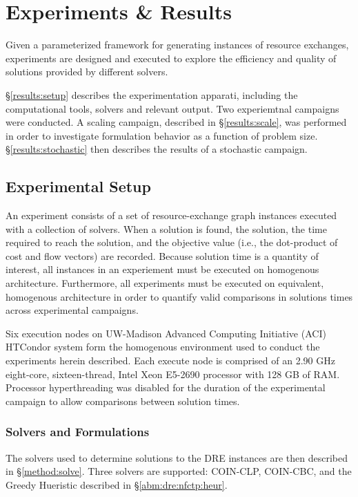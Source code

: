\chapter{Experiments \& Results}\label{ch:results}

Given a parameterized framework for generating instances of resource exchanges,
experiments are designed and executed to explore the efficiency and quality of
solutions provided by different solvers. 

\S \ref{results:setup} describes the experimentation apparati, including the
computational tools, solvers and relevant output. Two experiemtnal campaigns
were conducted. A scaling campaign, described in \S \ref{results:scale}, was
performed in order to investigate formulation behavior as a function of problem
size. \S \ref {results:stochastic} then describes the results of a stochastic
campaign.

\section{Experimental Setup}

An experiment consists of a set of resource-exchange graph instances executed
with a collection of solvers. When a solution is found, the solution, the time
required to reach the solution, and the objective value (i.e., the dot-product
of cost and flow vectors) are recorded. Because solution time is a quantity of
interest, all instances in an experiement must be executed on homogenous
architecture. Furthermore, all experiments must be executed on equivalent,
homogenous architecture in order to quantify valid comparisons in solutions
times across experimental campaigns.

Six execution nodes on UW-Madison Advanced Computing Initiative (ACI) HTCondor
system form the homogenous environment used to conduct the experiments herein
described. Each execute node is comprised of an 2.90 GHz eight-core,
sixteen-thread, Intel Xeon E5-2690 \cite{} processor with 128 GB of
RAM. Processor hyperthreading was disabled for the duration of the experimental
campaign to allow comparisons between solution times. 

\subsection{Solvers and Formulations}

The solvers used to determine solutions to the DRE instances are then described
in \S \ref{method:solve}. Three solvers are supported: COIN-CLP, COIN-CBC, and
the Greedy Hueristic described in \S \ref{abm:dre:nfctp:heur}.

